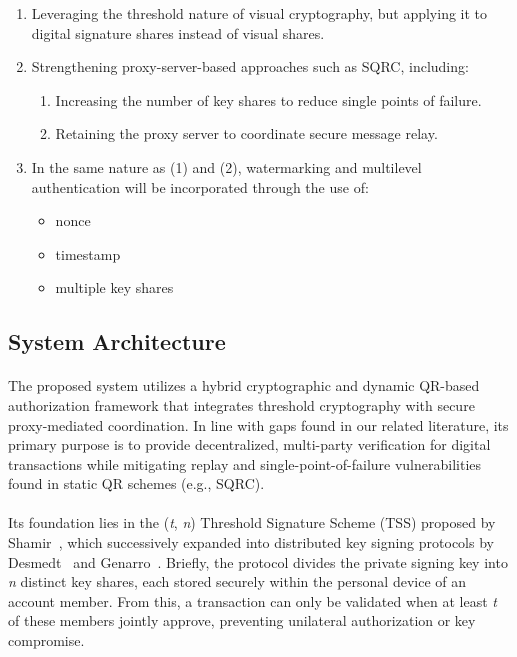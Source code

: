 \documentclass[a4paper]{scl-article}
\begin{document}
\begin{enumerate}
    \item Leveraging the threshold nature of visual cryptography, but applying it to digital signature shares instead of visual shares.

    \item Strengthening proxy-server-based approaches such as SQRC, including:
    \begin{enumerate}
        \item Increasing the number of key shares to reduce single points of failure.
        \item Retaining the proxy server to coordinate secure message relay.
    \end{enumerate}

    \item In the same nature as (1) and (2), watermarking and multilevel authentication will be incorporated through the use of:
    \begin{itemize}
        \item nonce
        \item timestamp
        \item multiple key shares
    \end{itemize}
\end{enumerate}


\subsection{System Architecture}
\label{sect:meth2}
\paragraph{}
The proposed system utilizes a hybrid cryptographic and dynamic QR-based authorization framework that integrates threshold cryptography with secure proxy-mediated coordination. In line with gaps found in our related literature, its primary purpose is to provide decentralized, multi-party verification for digital transactions while mitigating replay and single-point-of-failure vulnerabilities found in static QR schemes (e.g., SQRC).

\paragraph{}
Its foundation lies in the (\textit{t}, \textit{n}) Threshold Signature Scheme (TSS) proposed by Shamir~\cite{shamir1979}, which successively expanded into distributed key signing protocols by Desmedt~\cite{desmedt1988} and Genarro~\cite{gennaro2007}. Briefly, the protocol divides the private signing key into \textit{n} distinct key shares, each stored securely within the personal device of an account member. From this, a transaction can only be validated when at least \textit{t} of these members jointly approve, preventing unilateral authorization or key compromise.
\end{document}
